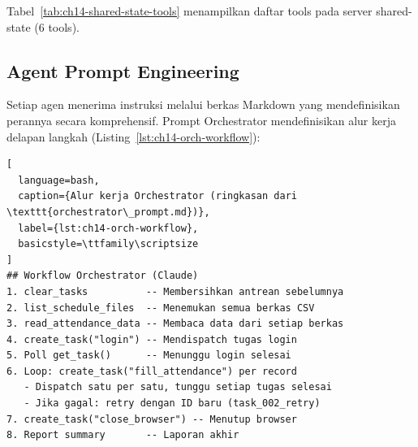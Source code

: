 Tabel~\ref{tab:ch14-shared-state-tools} menampilkan daftar tools pada server shared-state (6 tools).
\begin{table}[h]
\centering
\caption{Daftar tools pada server \texttt{shared-state} (6 tools)}
\label{tab:ch14-shared-state-tools}
\footnotesize
{}
\normalsize
\end{table}

\subsection{Agent Prompt Engineering}

Setiap agen menerima instruksi melalui berkas Markdown yang mendefinisikan perannya secara komprehensif. Prompt Orchestrator mendefinisikan alur kerja delapan langkah (Listing~\ref{lst:ch14-orch-workflow}):

\begin{lstlisting}[
  language=bash,
  caption={Alur kerja Orchestrator (ringkasan dari \texttt{orchestrator\_prompt.md})},
  label={lst:ch14-orch-workflow},
  basicstyle=\ttfamily\scriptsize
]
## Workflow Orchestrator (Claude)
1. clear_tasks          -- Membersihkan antrean sebelumnya
2. list_schedule_files  -- Menemukan semua berkas CSV
3. read_attendance_data -- Membaca data dari setiap berkas
4. create_task("login") -- Mendispatch tugas login
5. Poll get_task()      -- Menunggu login selesai
6. Loop: create_task("fill_attendance") per record
   - Dispatch satu per satu, tunggu setiap tugas selesai
   - Jika gagal: retry dengan ID baru (task_002_retry)
7. create_task("close_browser") -- Menutup browser
8. Report summary       -- Laporan akhir
\end{lstlisting}

